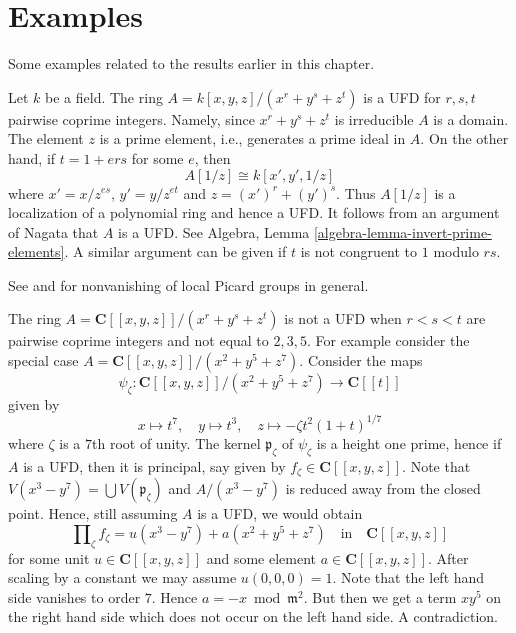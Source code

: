 \section{Examples}
\label{section-examples}

\noindent
Some examples related to the results earlier in this chapter.

\begin{example}
\label{example-factorial}
\begin{reference}
\cite[4(c)]{Samuel-UFD}
\end{reference}
Let $k$ be a field. The ring $A = k[x, y, z]/(x^r + y^s + z^t)$
is a UFD for $r, s, t$ pairwise coprime integers. Namely, since
$x^r + y^s + z^t$ is irreducible $A$ is a domain. The element $z$
is a prime element, i.e., generates a prime ideal in $A$.
On the other hand, if $t = 1 + ers$ for some $e$, then
$$
A[1/z] \cong k[x', y', 1/z]
$$
where $x' = x/z^{es}$, $y' = y/z^{et}$ and $z = (x')^r + (y')^s$.
Thus $A[1/z]$ is a localization of a polynomial ring and hence
a UFD. It follows from an argument of Nagata that $A$ is a UFD.
See Algebra, Lemma \ref{algebra-lemma-invert-prime-elements}.
A similar argument can be given if $t$ is not congruent to $1$
modulo $rs$.
\end{example}

\begin{example}
\label{example-completion-not-factorial}
\begin{reference}
See \cite{Brieskorn} and \cite{Lipman-rational} for nonvanishing of
local Picard groups in general.
\end{reference}
The ring $A = \mathbf{C}[[x, y, z]]/(x^r + y^s + z^t)$
is not a UFD when $r < s < t$ are pairwise coprime integers
and not equal to $2, 3, 5$. For example consider the special
case $A = \mathbf{C}[[x, y, z]]/(x^2 + y^5 + z^7)$.
Consider the maps
$$
\psi_\zeta : \mathbf{C}[[x, y, z]]/(x^2 + y^5 + z^7) \to \mathbf{C}[[t]]
$$
given by
$$
x \mapsto t^7,\quad
y \mapsto t^3,\quad
z \mapsto -\zeta t^2(1 + t)^{1/7}
$$
where $\zeta$ is a $7$th root of unity. The kernel $\mathfrak p_\zeta$
of $\psi_\zeta$ is a height one prime, hence if $A$ is a UFD, then
it is principal, say given by $f_\zeta \in \mathbf{C}[[x, y, z]]$.
Note that $V(x^3 - y^7) = \bigcup V(\mathfrak p_\zeta)$
and $A/(x^3 - y^7)$ is reduced away from the closed point. Hence,
still assuming $A$ is a UFD, we would obtain
$$
\prod\nolimits_\zeta f_\zeta = u(x^3 - y^7) + a(x^2 + y^5 + z^7)
\quad\text{in}\quad
\mathbf{C}[[x, y, z]]
$$
for some unit $u \in \mathbf{C}[[x, y, z]]$ and some
element $a \in \mathbf{C}[[x, y, z]]$. After scaling by a constant
we may assume $u(0, 0, 0) = 1$. Note that the left hand side vanishes to
order $7$. Hence $a = - x \bmod \mathfrak m^2$. But then we get a term
$xy^5$ on the right hand side which does not occur on the left
hand side. A contradiction.
\end{example}

